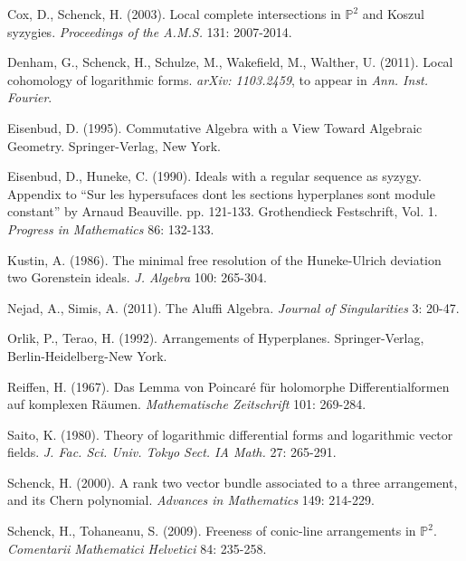 \documentclass[12pt]{amsart}
\begin{document}

\begin{thebibliography}{10}

 Cox, D., Schenck, H. (2003).
            Local complete intersections in $\mathbb P^2$ and Koszul syzygies.
            {\em Proceedings of the A.M.S.} 131: 2007-2014.

 Denham, G., Schenck, H., Schulze, M., Wakefield, M., Walther, U. (2011).
            Local cohomology of logarithmic forms.
            {\em arXiv: 1103.2459}, to appear in {\em Ann. Inst. Fourier}.

 Eisenbud, D. (1995).
            Commutative Algebra with a View Toward Algebraic Geometry.
            Springer-Verlag, New York.

 Eisenbud, D., Huneke, C. (1990).
            Ideals with a regular sequence as syzygy.
            Appendix to ``Sur les hypersufaces dont les sections hyperplanes sont module constant'' by Arnaud Beauville. pp. 121-133.
            Grothendieck Festschrift, Vol. 1.
            {\em Progress in Mathematics} 86: 132-133.

 Kustin, A. (1986).
            The minimal free resolution of the Huneke-Ulrich deviation two Gorenstein ideals.
            {\em J. Algebra} 100: 265-304.
            
 Nejad, A., Simis, A. (2011).
        The Aluffi Algebra.
        {\em Journal of Singularities} 3: 20-47.

 Orlik, P., Terao, H. (1992).
            Arrangements of Hyperplanes.
            Springer-Verlag, Berlin-Heidelberg-New York.

 Reiffen, H. (1967).
            Das Lemma von Poincar\'{e} f\"{u}r holomorphe Differentialformen auf komplexen
R\"{a}umen.
            {\em Mathematische Zeitschrift} 101: 269-284.

 Saito, K. (1980).
            Theory of logarithmic differential forms and logarithmic vector fields.
            {\em J. Fac. Sci. Univ. Tokyo Sect. IA Math.} 27: 265-291.

 Schenck, H. (2000).
             A rank two vector bundle associated to a three arrangement, and its Chern polynomial.
             {\em Advances in Mathematics} 149: 214-229.

 Schenck, H., Tohaneanu, S. (2009).
            Freeness of conic-line arrangements in $\mathbb P^2$.
            {\em Comentarii Mathematici Helvetici} 84: 235-258.


\end{thebibliography}
\end{document}
